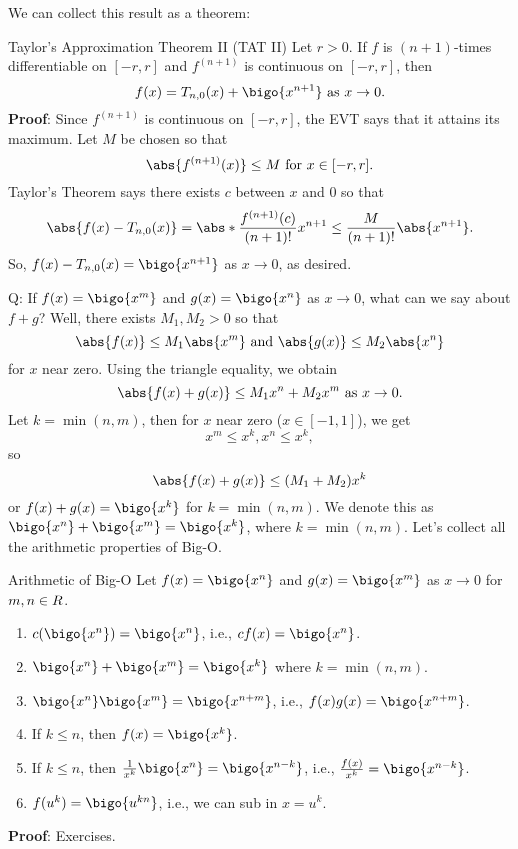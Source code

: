 We can collect this result as a theorem:
\begin{Theorem}{Taylor's Approximation Theorem II (TAT II)}{}
    Let $ r>0 $. If $ f $ is $ (n+1) $-times differentiable
    on $ [-r,r] $ and $ f^{(n+1)} $ is continuous on $ [-r,r] $,
    then
    \[ f(x)=T_{n,0}(x)+\bigo{x^{n+1}}\text{ as $x\to 0$}. \]
    \tcblower{}
    \textbf{Proof}: Since $ f^{(n+1)} $
    is continuous on $ [-r,r] $, the EVT
    says that it attains its maximum. Let
    $ M $ be chosen so that
    \[ \abs{f^{(n+1)}(x)}\le M\text{ for $x\in[-r,r]$}. \]
    Taylor's Theorem says there exists $ c $
    between $ x $ and $ 0 $ so that
    \[ \abs{f(x)-T_{n,0}(x)}=\abs*{\frac{f^{(n+1)}(c)}{(n+1)!}x^{n+1}}
        \le \frac{M}{(n+1)!}\abs{x^{n+1}}. \]
    So, $ f(x)-T_{n,0}(x)=\bigo{x^{n+1}} $ as
    $ x\to 0 $, as desired.
\end{Theorem}
Q\@: If $ f(x)=\bigo{x^m} $ and
$ g(x)=\bigo{x^n} $ as $ x\to 0 $, what
can we say about $ f+g $? Well, there exists
$ M_1,M_2>0 $ so that
\[ \abs{f(x)}\le M_1\abs{x^m}\text{ and }
    \abs{g(x)}\le M_2\abs{x^n} \]
for $ x $ near zero. Using the triangle equality, we obtain
\[ \abs{f(x)+g(x)}\le M_1x^n+M_2x^m\text{ as $x\to 0$}. \]
Let $ k=\min(n,m) $, then for $ x $ near
zero ($ x\in[-1,1] $), we get
\[ x^m\le x^k,x^n\le x^k, \]
so
\[ \abs{f(x)+g(x)}\le (M_1+M_2)x^k \]
or $ f(x)+g(x)=\bigo{x^k} $ for $ k=\min(n,m) $.
We denote this as $ \bigo{x^n}+\bigo{x^m}=\bigo{x^k} $,
where $ k=\min(n,m) $.
Let's collect all the arithmetic properties
of Big-O.
\begin{Theorem}{Arithmetic of Big-O}{}
    Let $ f(x)=\bigo{x^n} $ and $ g(x)=\bigo{x^m} $
    as $ x\to 0 $ for $ m,n\in\relax{R} $.
    \begin{enumerate}[(1)]
        \item $ c(\bigo{x^n})=\bigo{x^n} $, i.e.,
              $ c f(x)=\bigo{x^n} $.
        \item $ \bigo{x^n}+\bigo{x^m}=\bigo{x^k} $
              where $ k=\min(n,m) $.
        \item $ \bigo{x^n}\bigo{x^m}=\bigo{x^{n+m}} $, i.e.,
              $ f(x)g(x)=\bigo{x^{n+m}} $.
        \item If $ k\le n $, then $ f(x)=\bigo{x^k} $.
        \item If $ k\le n $, then $ \frac{1}{x^k}\bigo{x^n}=\bigo{x^{n-k}} $,
              i.e., $ \frac{f(x)}{x^k}=\bigo{x^{n-k}} $.
        \item $ f(u^k)=\bigo{u^{kn}} $, i.e., we can
              sub in $ x=u^k $.
    \end{enumerate}
    \tcblower{}
    \textbf{Proof}: Exercises.
\end{Theorem}
